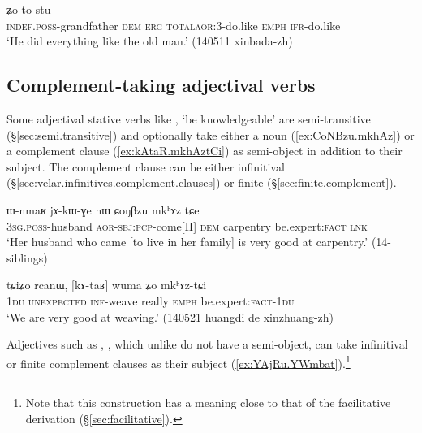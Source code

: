 \begin{exe}
\ex \label{ex:tWtastu.tostu2}
 ʑo to-stu \\
\textsc{indef}.\textsc{poss}-grandfather \textsc{dem} \textsc{erg} \textsc{total}\redp{}\textsc{aor}:3\flobv{}-do.like \textsc{emph} \textsc{ifr}-do.like  \\
\glt `He did everything like the old man.' (140511 xinbada-zh)
\end{exe}

\subsection{Complement-taking adjectival verbs} \label{sec:adjective.complement}
Some adjectival stative verbs like , `be knowledgeable' are semi-transitive (§\ref{sec:semi.transitive}) and optionally take either a noun (\ref{ex:CoNBzu.mkhAz}) or a complement clause (\ref{ex:kAtaR.mkhAztCi}) as semi-object in addition to their subject. The complement clause can be either infinitival (§\ref{sec:velar.infinitives.complement.clauses}) or finite (§\ref{sec:finite.complement}).

\begin{exe}
\ex \label{ex:CoNBzu.mkhAz}
\gll ɯ-nmaʁ jɤ-kɯ-ɣe nɯ ɕoŋβzu mkʰɤz tɕe \\
\textsc{3sg}.\textsc{poss}-husband \textsc{aor}-\textsc{sbj}:\textsc{pcp}-come[II] \textsc{dem} carpentry be.expert:\textsc{fact} \textsc{lnk} \\
\glt `Her husband who came [to live in her family] is very good at carpentry.' (14-siblings)
\end{exe}

\begin{exe}
\ex \label{ex:kAtaR.mkhAztCi}
\gll tɕiʑo rcanɯ, [kɤ-taʁ] wuma ʑo mkʰɤz-tɕi 	 \\
\textsc{1du}  \textsc{unexpected} \textsc{inf}-weave really \textsc{emph} be.expert:\textsc{fact}-\textsc{1du} \\
\glt `We are very good at weaving.' (140521 huangdi de xinzhuang-zh)
\end{exe}


Adjectives such as , , which unlike  do not have a semi-object, can take infinitival or finite complement clauses as their subject (\ref{ex:YAjRu.YWmbat}).\footnote{Note that this construction has a meaning close to that of the facilitative  derivation (§\ref{sec:facilitative}). }

